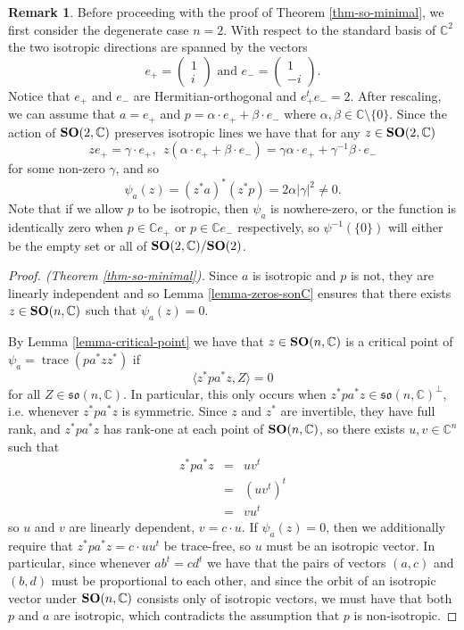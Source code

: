 \documentclass[11pt,reqno]{amsart}
\theoremstyle{plain}
\theoremstyle{definition}
\newtheorem{remark}       [theorem]  {Remark}
\numberwithin{equation}{section}
\def \cn{{\mathbb C}}
\def \SO#1{\text{\bf SO}(#1)}
\def \SOC#1{\text{\bf SO}(#1,\cn)}
\def \soc#1{\mathfrak{so}(#1,\cn)}
\DeclareMathOperator{\trace}{trace}
\numberwithin{equation}{section}
\begin{document}
\begin{remark}
	Before proceeding with the proof of Theorem \ref{thm-so-minimal}, we first consider the degenerate case $n=2$. With respect to the standard basis of $\cn^2$ the two isotropic directions are spanned by the vectors
$$ e_+ = \begin{pmatrix}
	1 \\ i
\end{pmatrix} \text{ and } e_- = \begin{pmatrix}
	1 \\ -i
\end{pmatrix}.$$
Notice that $e_+$ and $e_-$ are Hermitian-orthogonal and $e^t_+ e_- = 2$.
After rescaling, we can assume that $a = e_+$ and  $p = \alpha \cdot e_+ + \beta \cdot e_-$ where 
$\alpha,\beta \in \cn \setminus \{0\}$. Since the action of $\SOC{2}$ preserves isotropic lines we have that for any $z \in \SOC{2}$
$$ z e_+ = \gamma \cdot e_+, \ \ z (\alpha \cdot e_+ + \beta \cdot e_-) = \gamma \alpha \cdot e_+ + \gamma^{-1} \beta \cdot e_-$$
for some non-zero $\gamma$, and so
$$ \psi_a(z) = (z^* a)^* (z^* p) = 2 \alpha |\gamma|^2 \neq 0.$$
Note that if we allow $p$ to be isotropic, then $\psi_a$ is nowhere-zero, or the function is identically zero when $p \in \cn e_+$ or $p\in \cn e_-$ respectively, so $\psi^{-1}(\{0\})$ will either be the empty set or all of $\SOC{2}/\SO{2}$.
\end{remark}


\begin{proof}[Proof. (Theorem \ref{thm-so-minimal})]
Since $a$ is isotropic and $p$ is not, they are linearly independent and so Lemma \ref{lemma-zeros-sonC} ensures that there exists $z \in \SOC{n}$ such that $\psi_a(z) = 0$. 

By Lemma \ref{lemma-critical-point} we have that $z \in \SOC{n}$ is a critical point of $\psi_a = \trace (p a^* {z} z^{*})$ if
$$ \langle z^* p a^* z, Z \rangle = 0$$
for all $Z \in \soc{n}$.
In particular, this only occurs when $z^* p a^* z \in \soc{n}^\perp$, i.e. whenever $z^* p a^* z$ is symmetric. Since $z$ and $z^*$ are invertible, they have full rank, and $z^* p a^* z$ has rank-one at each point of $\SOC{n}$, so there exists $u,v \in \cn^n$ such that
\begin{eqnarray*}
	z^* p a^* z &=& u v^t \\
	&=& (u v^t)^t \\
	&=& v u^t
\end{eqnarray*}
so $u$ and $v$ are linearly dependent, $v = c \cdot u$.
If $\psi_a(z) = 0$, then we additionally require that $z^* p a^* z = c\cdot u u^t$ be trace-free, so $u$ must be an isotropic vector. In particular, since whenever $ a b^t = c d^t$ we have that the pairs of vectors $(a,c)$ and $(b,d)$ must be proportional to each other, and since the orbit of an isotropic vector under $\SOC{n}$ consists only of isotropic vectors, we must have that both $p$ and $a$ are isotropic, which contradicts the assumption that $p$ is non-isotropic.

\end{proof}
\end{document}
